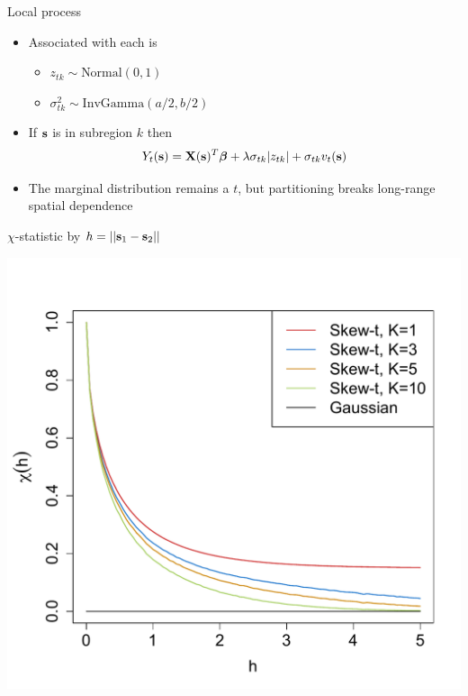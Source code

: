 \documentclass{beamer}
\begin{document}
\begin{frame}{Local \skewt{} process}
	\begin{itemize}\setlength{\itemsep}{1em}
    \item Associated with each is \vspace{0.5em}
    \begin{itemize} \setlength{\itemsep}{0.5em}
      \item $z_{tk}\sim\mbox{Normal}(0,1)$
      \item $\sigma_{tk}^2\sim\mbox{InvGamma}(a/2,b/2)$
    \end{itemize}
		\item If $\mathbf{s}$ is in subregion $k$ then $$Y_t(\mathbf{s}) = \mathbf{X}(\mathbf{s})^T\mbox{\boldmath $\beta$} +\lambda\sigma_{tk}|z_{tk}| + \sigma_{tk}v_t(\mathbf{s})\nonumber$$
		\item The marginal distribution remains a $t$, but partitioning breaks long-range spatial dependence
	\end{itemize}
\end{frame}

 \begin{frame}{$\chi$-statistic by $h=||\mathbf{s}_1-\mathbf{s}_2||$}
 	\begin{center}
 		\includegraphics[height=0.8\textheight]{plots/chi-h}
 	\end{center}
 \end{frame}
\end{document}
